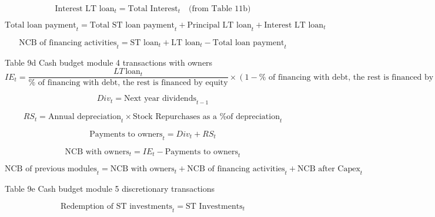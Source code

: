 \documentclass[12pt]{article}
\numberwithin{equation}{section}
\begin{document}
\begin{equation}
	\text{Interest LT loan}_{t} = \text{Total Interest}_{t} \quad \text{(from Table 11b)}
\end{equation}

\begin{equation}
	\text{Total loan payment}_{t} = \text{Total ST loan payment}_{t} + \text{Principal LT loan}_{t} + \text{Interest LT loan}_{t}
\end{equation}

\begin{equation}
	\text{NCB of financing activities}_{t} = \text{ST loan}_{t} + \text{LT loan}_{t} - \text{Total loan payment}_{t}
\end{equation}


Table 9d Cash budget module 4 transactions with owners
\begin{equation}
	IE_{t} = \frac{LT \, \text{loan}_{t}}{\% \text{ of financing with debt, the rest is financed by equity}} \times \left(1 - \% \text{ of financing with debt, the rest is financed by equity}\right)
\end{equation}

\begin{equation}
	Div_{t} = \text{Next year dividends}_{t-1}
\end{equation}

\begin{equation}
	RS_{t} = \text{Annual depreciation}_{t} \times \text{Stock Repurchases as a \% of depreciation}_{t}
\end{equation}

\begin{equation}
	\text{Payments to owners}_{t} = Div_{t} + RS_{t}
\end{equation}

\begin{equation}
	\text{NCB with owners}_{t} = IE_{t} - \text{Payments to owners}_{t}
\end{equation}

\begin{equation}
	\text{NCB of previous modules}_{t} = \text{NCB with owners}_{t} + \text{NCB of financing activities}_{t} + \text{NCB after Capex}_{t}
\end{equation}

Table 9e Cash budget module 5 discretionary transactions

\begin{equation}
	\text{Redemption of ST investments}_{t} = \text{ST Investments}_{t}
\end{equation}
\end{document}
